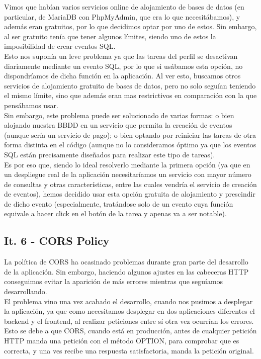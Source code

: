 Vimos que habían varios servicios online de alojamiento de bases de datos (en particular, de MariaDB con PhpMyAdmin, que era lo que necesitábamos), y además eran gratuitos, por lo que decidimos optar por uno de estos. Sin embargo, al ser gratuito tenía que tener algunos límites, siendo uno de estos la imposibilidad de crear eventos SQL.\\

Esto nos suponía un leve problema ya que las tareas del perfil se desactivan diariamente mediante un evento SQL, por lo que si usábamos esta opción, no dispondríamos de dicha función en la aplicación. Al ver esto, buscamos otros servicios de alojamiento gratuito de bases de datos, pero no solo seguían teniendo el mismo límite, sino que además eran mas restrictivos en comparación con la que pensábamos usar.\\

Sin embargo, este problema puede ser solucionado de varias formas: o bien alojando nuestra BBDD en un servicio que permita la creación de eventos (aunque sería un servicio de pago); o bien optando por reiniciar las tareas de otra forma distinta en el código (aunque no lo consideramos óptimo ya que los eventos SQL están precisamente diseñados para realizar este tipo de tareas).\\

Es por eso que, siendo lo ideal resolverlo mediante la primera opción (ya que en un despliegue real de la aplicación necesitaríamos un servicio con mayor número de consultas y otras características, entre las cuales vendría el servicio de creación de eventos), hemos decidido usar esta opción gratuita de alojamiento y prescindir de dicho evento (especialmente, tratándose solo de un evento cuya función equivale a hacer click en el botón de la tarea y apenas va a ser notable).\\

\subsection{It. 6 - CORS Policy}

La política de CORS ha ocasinado problemas durante gran parte del desarrollo de la aplicación. Sin embargo, haciendo algunos ajustes en las cabeceras HTTP conseguimos evitar la aparición de más errores mientras que seguíamos desarrollando.\\

El problema vino una vez acabado el desarrollo, cuando nos pusimos a desplegar la aplicación, ya que como necesitamos desplegar en dos aplicaciones diferentes el backend y el frontend, al realizar peticiones entre sí otra vez ocurrían los errores. Esto se debe a que CORS, cuando está en producción, antes de cualquier petición HTTP manda una petición con el método OPTION, para comprobar que es correcta, y una ves recibe una respuesta satisfactoria, manda la petición original.\\

